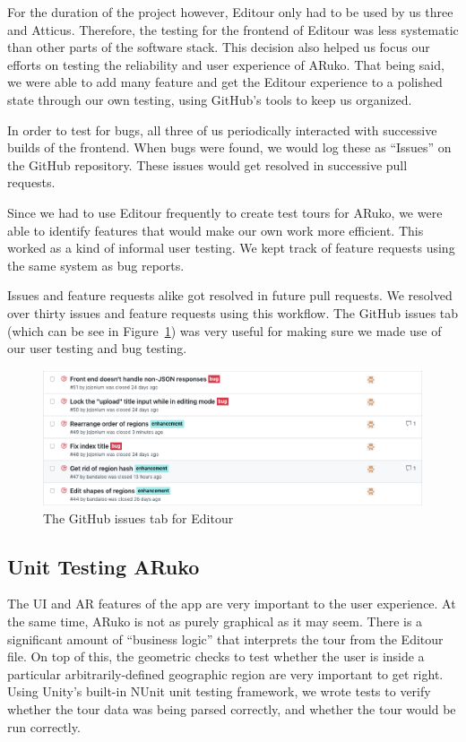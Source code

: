 \documentclass[a4paper, 10pt, american, titlepage]{article}
\begin{document}
For the duration of the project however, Editour only had to be used by us
three and Atticus. Therefore, the testing for the frontend of Editour was less
systematic than other parts of the software stack. This decision also helped us
focus our efforts on testing the reliability and user experience of ARuko. That
being said, we were able to add many feature and get the Editour experience to
a polished state through our own testing, using GitHub's tools to keep us
organized.

In order to test for bugs, all three of us periodically interacted with
successive builds of the frontend. When bugs were found, we would log these as
``Issues'' on the GitHub repository. These issues would get resolved in
successive pull requests.

Since we had to use Editour frequently to create test tours for ARuko, we were
able to identify features that would make our own work more efficient. This
worked as a kind of informal user testing. We kept track of feature requests
using the same system as bug reports.

Issues and feature requests alike got resolved in future pull requests. We
resolved over thirty issues and feature requests using this workflow. The
GitHub issues tab (which can be see in Figure~\ref{fig:issuesPageExample}) was
very useful for making sure we made use of our user testing and bug testing.

\begin{figure}[h]
	\centering
	\includegraphics[width=\textwidth]{issues-page-example.png}
	\caption{The GitHub issues tab for Editour}
	\label{fig:issuesPageExample}
\end{figure}

\subsection{Unit Testing ARuko}
\label{sec:unitTestingARuko}

The UI and AR features of the app are very important to the user experience. At
the same time, ARuko is not as purely graphical as it may seem. There is a
significant amount of ``business logic'' that interprets the tour from the
Editour file. On top of this, the geometric checks to test whether the user is
inside a particular arbitrarily-defined geographic region are very important to
get right.  Using Unity's built-in NUnit unit testing framework, we wrote tests
to verify whether the tour data was being parsed correctly, and whether the tour
would be run correctly.
\end{document}
